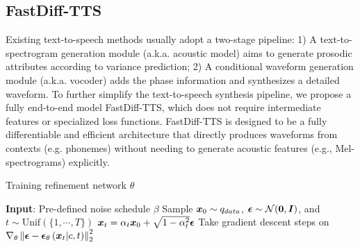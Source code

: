 
\subsection{FastDiff-TTS} \label{FastDiff_TTS}
Existing text-to-speech methods usually adopt a two-stage pipeline: 1) A text-to-spectrogram generation module (a.k.a. acoustic model) aims to generate prosodic attributes according to variance prediction; 2) A conditional waveform generation module (a.k.a. vocoder) adds the phase information and synthesizes a detailed waveform. To further simplify the text-to-speech synthesis pipeline, we propose a fully end-to-end model FastDiff-TTS, which does not require intermediate features or specialized loss functions. FastDiff-TTS is designed to be a fully differentiable and efficient architecture that directly produces waveforms from contexts (e.g. phonemes) without needing to generate acoustic features (e.g., Mel-spectrograms) explicitly. 

\begin{algorithm}[ht]
    \centering
    \caption{Training refinement network $\theta$}\label{alg: training}
    \begin{algorithmic}[1]
     \STATE \textbf{Input}:  Pre-defined noise schedule $\beta$
    \REPEAT 
    \STATE Sample ${\bm{x}}_{0} \sim q_{data}$, ${\boldsymbol{\epsilon}}\sim{\mathcal{N}}({\bm{0}},{\bm{I}})$, and $t\sim\mathrm{Unif}(\{1,\cdots,T\})$
    \STATE ${\bm{x}}_t = \alpha_{t} {\bm{x}}_{0}+ \sqrt{1-\alpha_{t}^2} {\boldsymbol{\epsilon}}$
    \STATE Take gradient descent steps on $\nabla_{\theta}\left\|{\boldsymbol{\epsilon}}-{\boldsymbol{\epsilon}}_{\theta}\left({\bm{x}}_t|c, t\right)\right\|_{2}^{2}$ 
  
    \end{algorithmic}
    \end{algorithm}

